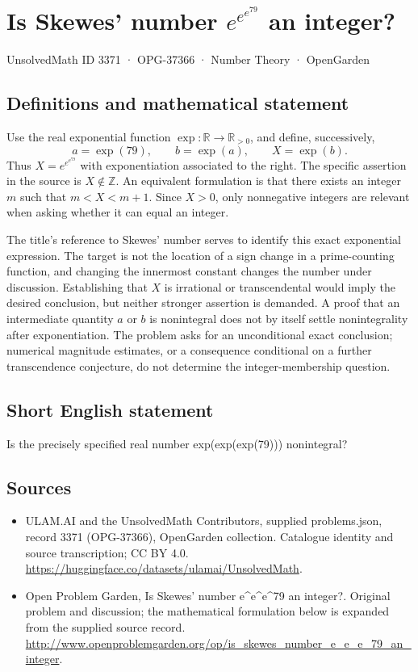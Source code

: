 \documentclass[11pt,a4paper]{article}
\begin{document}
\section*{Is Skewes' number $e^{e^{e^{79}}}$ an integer?}\label{3371}
{\small UnsolvedMath ID 3371 · OPG-37366 · Number Theory · OpenGarden}
\subsection{Definitions and mathematical statement}
Use the real exponential function $\exp:\mathbb R\to\mathbb R_{>0}$,
and define, successively,
\[
 a=\exp(79),\qquad b=\exp(a),\qquad X=\exp(b).
\]
Thus $X=e^{e^{e^{79}}}$ with exponentiation associated to the right.
The specific assertion in the source is $X\notin\mathbb Z$. An
equivalent formulation is that there exists an integer $m$ such that
$m<X<m+1$. Since $X>0$, only nonnegative integers are relevant when
asking whether it can equal an integer.

The title's reference to Skewes' number serves to identify this exact
exponential expression. The target is not the location of a sign
change in a prime-counting function, and changing the innermost
constant changes the number under discussion. Establishing that $X$
is irrational or transcendental would imply the desired conclusion,
but neither stronger assertion is demanded. A proof that an
intermediate quantity $a$ or $b$ is nonintegral does not by itself
settle nonintegrality after exponentiation. The problem asks for an
unconditional exact conclusion; numerical magnitude estimates, or
a consequence conditional on a further transcendence conjecture,
do not determine the integer-membership question.
\subsection{Short English statement}
Is the precisely specified real number exp(exp(exp(79))) nonintegral?
\subsection{Sources}
\begin{itemize}
\item[S1] ULAM.AI and the UnsolvedMath Contributors, supplied problems.json, record 3371 (OPG-37366), OpenGarden collection. Catalogue identity and source transcription; CC BY 4.0.
\url{https://huggingface.co/datasets/ulamai/UnsolvedMath}.
\item[S2] Open Problem Garden, Is Skewes' number e\textasciicircum{}e\textasciicircum{}e\textasciicircum{}79 an integer?. Original problem and discussion; the mathematical formulation below is expanded from the supplied source record.
\url{http://www.openproblemgarden.org/op/is_skewes_number_e_e_e_79_an_integer}.
\end{itemize}
\end{document}
